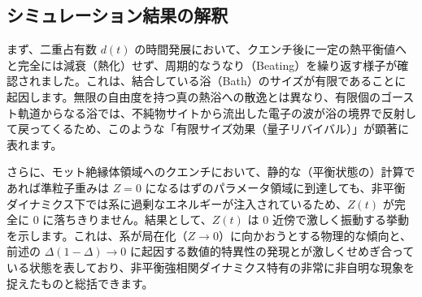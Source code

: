 \documentclass[a4paper,11pt]{ltjarticle}
\begin{document}
\subsection{シミュレーション結果の解釈}
まず、二重占有数 $d(t)$ の時間発展において、クエンチ後に一定の熱平衡値へと完全には減衰（熱化）せず、周期的なうなり（Beating）を繰り返す様子が確認されました。これは、結合している浴（Bath）のサイズが有限であることに起因します。無限の自由度を持つ真の熱浴への散逸とは異なり、有限個のゴースト軌道からなる浴では、不純物サイトから流出した電子の波が浴の境界で反射して戻ってくるため、このような「有限サイズ効果（量子リバイバル）」が顕著に表れます。

さらに、モット絶縁体領域へのクエンチにおいて、静的な（平衡状態の）計算であれば準粒子重みは $Z=0$ になるはずのパラメータ領域に到達しても、非平衡ダイナミクス下では系に過剰なエネルギーが注入されているため、$Z(t)$ が完全に $0$ に落ちきりません。結果として、$Z(t)$ は $0$ 近傍で激しく振動する挙動を示します。これは、系が局在化（$Z \to 0$）に向かおうとする物理的な傾向と、前述の $\Delta(1-\Delta) \to 0$ に起因する数値的特異性の発現とが激しくせめぎ合っている状態を表しており、非平衡強相関ダイナミクス特有の非常に非自明な現象を捉えたものと総括できます。
\end{document}
